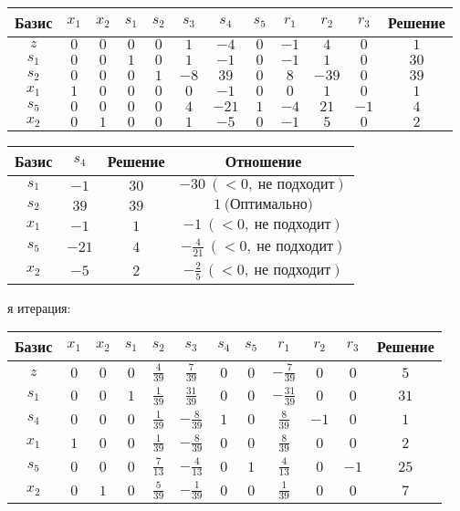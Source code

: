 \documentclass{article}%
\begin{document}
\begin{flushleft}
\newline%
\renewcommand{\arraystretch}{1.3}%
\begin{tabular}{|c|cccccccccc|c|}%
\hline%
Базис&$x_{1}$&$x_{2}$&$s_{1}$&$s_{2}$&$s_{3}$&$s_{4}$&$s_{5}$&$r_{1}$&$r_{2}$&$r_{3}$&Решение\\%
\hline%
$z$&$0$&$0$&$0$&$0$&$1$&$-4$&$0$&$-1$&$4$&$0$&$1$\\%
\hline%
$s_{1}$&$0$&$0$&$1$&$0$&$1$&$-1$&$0$&$-1$&$1$&$0$&$30$\\%
$s_{2}$&$0$&$0$&$0$&$1$&$-8$&$39$&$0$&$8$&$-39$&$0$&$39$\\%
$x_{1}$&$1$&$0$&$0$&$0$&$0$&$-1$&$0$&$0$&$1$&$0$&$1$\\%
$s_{5}$&$0$&$0$&$0$&$0$&$4$&$-21$&$1$&$-4$&$21$&$-1$&$4$\\%
$x_{2}$&$0$&$1$&$0$&$0$&$1$&$-5$&$0$&$-1$&$5$&$0$&$2$\\%
\hline%
\end{tabular}%
\newline%
\newline%
\newline%
\begin{tabular}{|cccc|}%
\hline%
Базис&$s_{4}$&Решение&Отношение\\%
\hline%
$s_{1}$&$-1$&$30$&$-30\: (< 0, \: \text{не подходит})$\\%
$s_{2}$&$39$&$39$&$1\: \text{(Оптимально)}$\\%
$x_{1}$&$-1$&$1$&$-1\: (< 0, \: \text{не подходит})$\\%
$s_{5}$&$-21$&$4$&$-\frac{4}{21}\: (< 0, \: \text{не подходит})$\\%
$x_{2}$&$-5$&$2$&$-\frac{2}{5}\: (< 0, \: \text{не подходит})$\\%
\hline%
\end{tabular}%
\newline%
\newline%
я итерация: %
\newline%
\newline%
\renewcommand{\arraystretch}{1.3}%
\begin{tabular}{|c|cccccccccc|c|}%
\hline%
Базис&$x_{1}$&$x_{2}$&$s_{1}$&$s_{2}$&$s_{3}$&$s_{4}$&$s_{5}$&$r_{1}$&$r_{2}$&$r_{3}$&Решение\\%
\hline%
$z$&$0$&$0$&$0$&$\frac{4}{39}$&$\frac{7}{39}$&$0$&$0$&$-\frac{7}{39}$&$0$&$0$&$5$\\%
\hline%
$s_{1}$&$0$&$0$&$1$&$\frac{1}{39}$&$\frac{31}{39}$&$0$&$0$&$-\frac{31}{39}$&$0$&$0$&$31$\\%
$s_{4}$&$0$&$0$&$0$&$\frac{1}{39}$&$-\frac{8}{39}$&$1$&$0$&$\frac{8}{39}$&$-1$&$0$&$1$\\%
$x_{1}$&$1$&$0$&$0$&$\frac{1}{39}$&$-\frac{8}{39}$&$0$&$0$&$\frac{8}{39}$&$0$&$0$&$2$\\%
$s_{5}$&$0$&$0$&$0$&$\frac{7}{13}$&$-\frac{4}{13}$&$0$&$1$&$\frac{4}{13}$&$0$&$-1$&$25$\\%
$x_{2}$&$0$&$1$&$0$&$\frac{5}{39}$&$-\frac{1}{39}$&$0$&$0$&$\frac{1}{39}$&$0$&$0$&$7$\\%
\hline%
\end{tabular}%
\newline%
\end{flushleft}%
\end{document}
